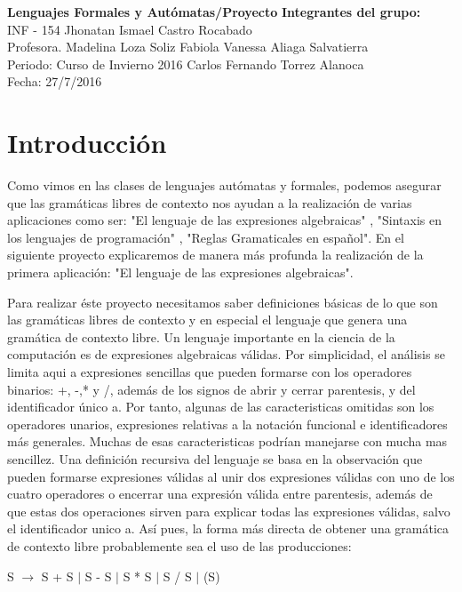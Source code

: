 \documentclass[a4paper, 11pt]{article}
\begin{document}
\noindent
\large\textbf{Lenguajes Formales y Autómatas/Proyecto} \hfill \textbf{Integrantes del grupo:} \\
\normalsize INF - 154 \hfill Jhonatan Ismael Castro Rocabado\\
Profesora. Madelina Loza Soliz \hfill Fabiola Vanessa Aliaga Salvatierra\\
Periodo: Curso de Invierno 2016 \hfill Carlos Fernando Torrez Alanoca\\
\hfill Fecha: 27/7/2016 \\

\section*{Introducción}
Como vimos en las clases de lenguajes autómatas y formales, podemos asegurar que las gramáticas libres de contexto nos ayudan a la realización de varias aplicaciones como ser: "El lenguaje de las expresiones algebraicas" , "Sintaxis en los lenguajes de programación" , "Reglas Gramaticales en español". En el siguiente proyecto explicaremos de manera más profunda la realización de la primera aplicación:
"El lenguaje de las expresiones algebraicas".

Para realizar éste proyecto necesitamos saber definiciones básicas de lo que son las gramáticas libres de contexto y en especial el lenguaje que genera una gramática de contexto libre. 
Un lenguaje importante en la ciencia de la computación es de expresiones algebraicas válidas. Por simplicidad, el análisis se limita aqui a expresiones sencillas que pueden formarse con los operadores binarios: +, -,* y /, además de los signos de abrir y cerrar parentesis, y del identificador único a.
Por tanto, algunas de las caracteristicas omitidas son los operadores unarios, expresiones relativas a la notación funcional e identificadores más generales.
Muchas de esas caracteristicas podrían manejarse con mucha mas sencillez.
Una definición recursiva del lenguaje se basa en la observación que pueden formarse expresiones válidas al unir dos expresiones válidas con uno de los cuatro operadores o encerrar una expresión válida entre parentesis, además de que estas dos operaciones sirven para explicar todas las expresiones válidas, salvo el identificador unico a. Así pues, la forma más directa de obtener una gramática de contexto libre probablemente  sea el uso de las producciones:

S $\rightarrow$ S + S  $|$ S - S  $|$ S * S  $|$ S / S  $|$ (S)
\end{document}
